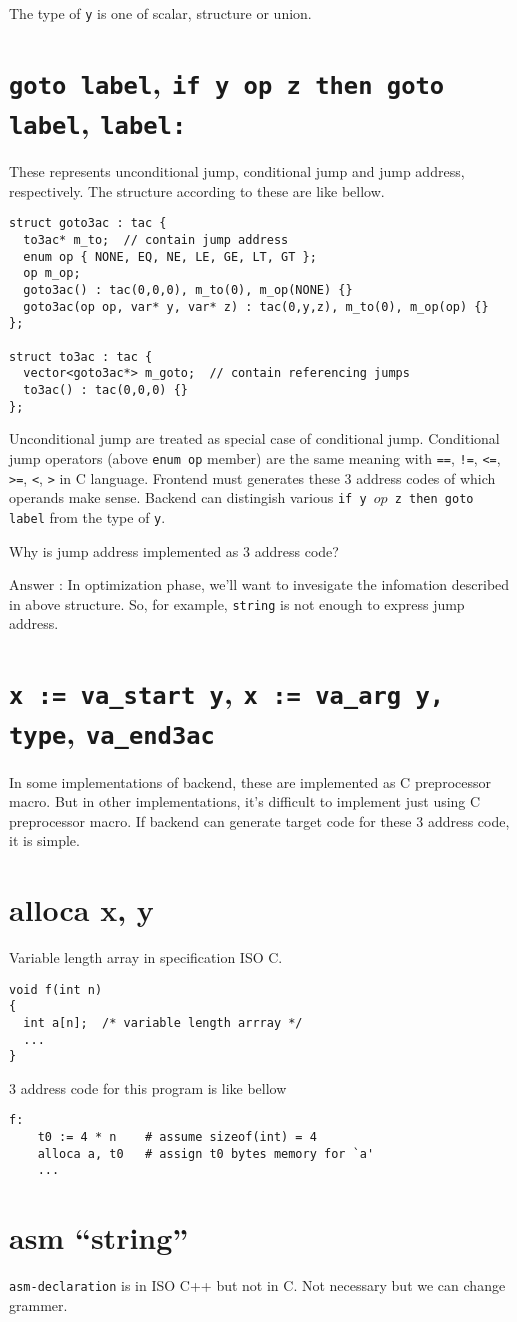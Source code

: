 The type of {\tt{y}} is one of scalar, structure or union.

\section{{\tt{goto label}}, {\tt{if y op z then goto label}}, {\tt{label:}}}
\label{_3ac_e002}
These represents unconditional jump, conditional jump and
jump address,  respectively. The structure according to these are
like bellow.
\begin{verbatim}
struct goto3ac : tac {
  to3ac* m_to;  // contain jump address
  enum op { NONE, EQ, NE, LE, GE, LT, GT };
  op m_op;
  goto3ac() : tac(0,0,0), m_to(0), m_op(NONE) {}
  goto3ac(op op, var* y, var* z) : tac(0,y,z), m_to(0), m_op(op) {}
};

struct to3ac : tac {
  vector<goto3ac*> m_goto;  // contain referencing jumps
  to3ac() : tac(0,0,0) {}
};
\end{verbatim}
Unconditional jump are treated as special case of conditional jump.
Conditional jump operators (above {\tt{enum op}} member) 
are the same meaning with 
{\tt{==}}, {\tt{!=}}, {\tt{<=}}, {\tt{>=}}, {\tt{<}}, {\tt{>}}
in C language.
Frontend must generates these 3 address codes of which operands make sense.
Backend can distingish various {\tt{if y $op$ z then goto label}}
from the type of {\tt{y}}.

\begin{QandA}
Why is jump address implemented as 3 address code?

Answer : In optimization phase, we'll want to invesigate
the infomation described in above structure. So, for example,
{\tt{string}} is not enough to express jump address.
\end{QandA}

\section{ {\tt{x := va\_start y}}, {\tt{x := va\_arg y, type}}, {\tt{va\_end3ac}}}

In some implementations of backend,
these are implemented as C preprocessor macro.
But in other implementations, it's difficult to implement just using
C preprocessor macro. If backend can generate target code
for these 3 address code, it is simple.

\section{alloca x, y}
\label{_3ac_e003}
Variable length array in specification ISO C. 
\begin{verbatim}
void f(int n)
{
  int a[n];  /* variable length arrray */
  ...
}
\end{verbatim}
3 address code for this program is like bellow
\begin{verbatim}
f:
    t0 := 4 * n    # assume sizeof(int) = 4
    alloca a, t0   # assign t0 bytes memory for `a'
    ...
\end{verbatim}

\section{asm ``string''}

{\tt{asm-declaration}} is in ISO C++ but not in C.
Not necessary but we can change grammer.


